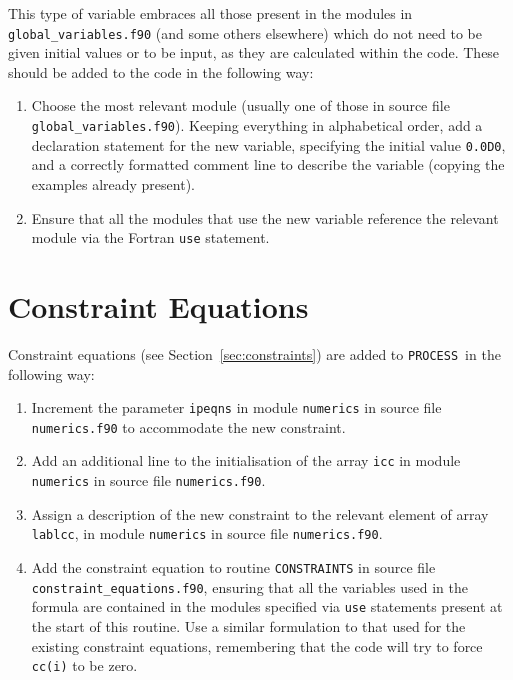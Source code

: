 \documentclass[11pt,a4paper]{report}
\newcommand{\process}{\mbox{\texttt{PROCESS}}}
\begin{document}
This type of variable embraces all those present in the modules in
\texttt{global\_variables.f90} (and some others elsewhere) which do not need
to be given initial values or to be input, as they are calculated within the
code. These should be added to the code in the following way:

\begin{enumerate}

\item Choose the most relevant module (usually one of those in source file
  \texttt{global\_variables.f90}). Keeping everything in alphabetical order,
  add a declaration statement for the new variable, specifying the initial
  value \texttt{0.0D0}, and a correctly formatted comment line to describe the
  variable (copying the examples already present).

\item Ensure that all the modules that use the new variable reference the
  relevant module via the Fortran \texttt{use} statement.

\end{enumerate}

\section{Constraint Equations}

Constraint equations (see Section~\ref{sec:constraints}) are added to
\process\ in the following way:

\begin{enumerate}

\item Increment the parameter \texttt{ipeqns} in module \texttt{numerics} in
  source file \texttt{numerics.f90} to accommodate the new constraint.

\item Add an additional line to the initialisation of the array \texttt{icc}
  in module \texttt{numerics} in source file \texttt{numerics.f90}.

\item Assign a description of the new constraint to the relevant element of
  array \texttt{lablcc}, in module \texttt{numerics} in source file
  \texttt{numerics.f90}.

\item Add the constraint equation to routine \texttt{CONSTRAINTS} in source
  file \texttt{constraint\_equations.f90}, ensuring that all the variables
  used in the formula are contained in the modules specified via \texttt{use}
  statements present at the start of this routine.  Use a similar formulation
  to that used for the existing constraint equations, remembering that the
  code will try to force \texttt{cc(i)} to be zero.

\end{enumerate}
\end{document}

